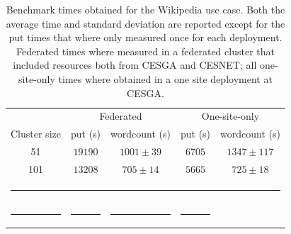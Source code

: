 \documentclass[oribibl]{llncs_Ibergrid2013}
\begin{document}
\begin{table}[h!]
\caption{Benchmark times obtained for the Wikipedia use case. Both the average time and standard deviation are reported except for the put times that where only measured once for each deployment. Federated times where measured in a federated cluster that included resources both from CESGA and CESNET; all one-site-only times where obtained in a one site deployment at CESGA. }
\label{table:wikipedia}
%
\vspace{-0.5em}
%
\begin{center}
\begin{tabular}{ccccc}
\toprule
    					& \multicolumn{2}{c}{Federated} 		& \multicolumn{2}{c}{One-site-only} \\
Cluster size				& put (s)		& wordcount (s) 	& put (s)		& wordcount (s)\\
\midrule
51                   			& $19190$		& $1001\pm39$      	& $6705$		& $1347\pm117$\\
101                  			& $13208$		& $705\pm14$      	& $5665$		& $725\pm18$\\
%
\bottomrule
\multicolumn{5}{c}{\rule{0.98\textwidth}{0em}}\\
\rule{0.2\textwidth}{0cm} & \rule{0.2\textwidth}{0cm} & \rule{0.2\textwidth}{0cm} &  \rule{0.2\textwidth}{0cm} & \\
\end{tabular}
\end{center}
\end{table}
\end{document}
